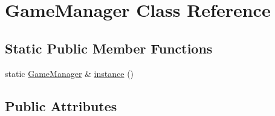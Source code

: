 \hypertarget{class_game_manager}{}\section{Game\+Manager Class Reference}
\label{class_game_manager}
\subsection*{Static Public Member Functions}
\begin{DoxyCompactItemize}
\item 
static \hyperlink{class_game_manager}{Game\+Manager} \& \hyperlink{class_game_manager_afa37ab23c040b5225d567d4c9ab854e1}{instance} ()
\end{DoxyCompactItemize}
\subsection*{Public Attributes}
